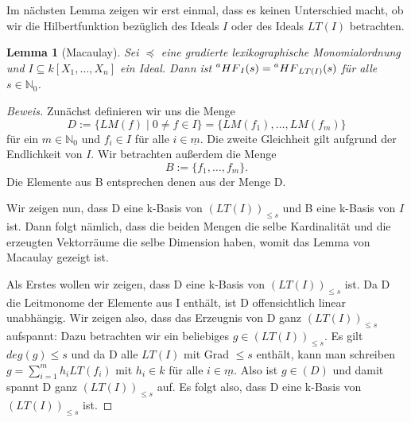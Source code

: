 \documentclass{article}
\newtheorem{lemma}[satz]{Lemma}
\newcommand*{\R}{k[X_{1},\ldots,X_{n}]}
\begin{document}
	Im nächsten Lemma zeigen wir erst einmal, dass es keinen Unterschied macht, ob wir die Hilbertfunktion bezüglich des Ideals \(I\) oder des Ideals \(LT(I)\) betrachten.

	\begin{lemma}[Macaulay] \label{1.2.13}
	Sei \(\preceq\) eine gradierte lexikographische Monomialordnung und \(I \subseteq \R\) ein
	Ideal. Dann ist \(\prescript{a}{}{HF}_{I}(s) = \prescript{a}{}{HF}_{LT(I)}(s)\) für alle
	\(s \in \mathbb{N}_{0}\).
	\end{lemma}

	
	\begin{proof}[Beweis]
	Zunächst definieren wir uns die Menge
	\begin{displaymath}
		D := \{ LM(f) \; | \; 0 \neq f \in I \} = \{LM(f_1), \ldots, LM(f_m)\}
	\end{displaymath}
	für ein \(m \in \mathbb{N}_{0}\) und \(f_{i} \in I\) für alle \(i \in \underline{m}\). Die
	zweite Gleichheit gilt aufgrund der Endlichkeit von \(I\).
	Wir betrachten außerdem die Menge
	\begin{displaymath} B := \{f_{1}, \ldots, f_{m}\}. \end{displaymath}
	Die Elemente aus B entsprechen denen aus der Menge D.

	Wir zeigen nun, dass D eine k-Basis von \((LT(I))_{\leq s}\) und B eine k-Basis von \(I\) ist.
	Dann folgt nämlich, dass die beiden Mengen die selbe Kardinalität und die erzeugten
	Vektorräume die selbe Dimension haben, womit das Lemma von Macaulay gezeigt ist.

	Als Erstes wollen wir zeigen, dass D eine k-Basis von \((LT(I))_{\leq s}\) ist. Da D die
	Leitmonome der Elemente aus I enthält, ist D offensichtlich linear unabhängig.
	Wir zeigen also, dass das Erzeugnis von D ganz \((LT(I))_{\leq s}\) aufspannt: Dazu
	betrachten wir ein beliebiges \(g \in (LT(I))_{\leq s}\). Es gilt \(deg(g) \leq s\) und da D
	alle \(LT(I)\) mit Grad \(\leq s\) enthält, kann man schreiben 
	\(g = \sum_{i=1}^{m} h_{i}LT(f_{i})\) mit \(h_{i} \in k\) für alle \(i \in \underline{m}\).
	Also ist \(g \in (D)\) und damit spannt D ganz \((LT(I))_{\leq s}\) auf. Es folgt also, dass
	D eine k-Basis von \((LT(I))_{\leq s}\) ist.
	

\end{proof}
\end{document}
